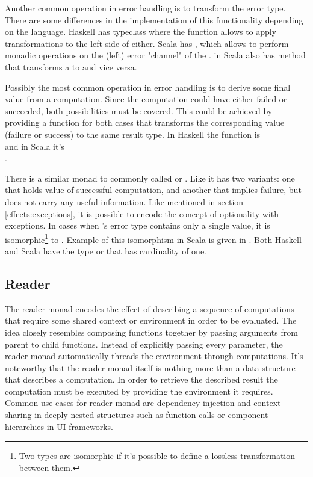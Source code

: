 Another common operation in error handling is to transform the error type. There are some differences in the implementation of this functionality depending on the language. Haskell has  typeclass where the function  allows to apply transformations to the left side of either. Scala has , which allows to perform monadic operations on the (left) error "channel" of the .  in Scala also has  method that transforms a  to  and vice versa.

Possibly the most common operation in error handling is to derive some final value from a computation. Since the computation could have either failed or succeeded, both possibilities must be covered. This could be achieved by providing a function for both cases that transforms the corresponding value (failure or success) to the same result type. In Haskell the function is \\ and in Scala it's \\. 

There is a similar monad to  commonly called  or . Like  it has two variants: one that holds value of successful computation, and another that implies failure, but does not carry any useful information. Like mentioned in section \ref{effects:exceptions}, it is possible to encode the concept of optionality with exceptions. In cases when 's error type contains only a single value, it is isomorphic\footnote{Two types are isomorphic if it's possible to define a lossless transformation between them.} to . Example of this isomorphism in Scala is given in . Both Haskell and Scala have the type  or \inlinecode{()} that has cardinality of one.




\subsection{Reader}
The reader monad encodes the effect of describing a sequence of computations that require some shared context or environment in order to be evaluated. The idea closely resembles composing functions together by passing arguments from parent to child functions. Instead of explicitly passing every parameter, the reader monad automatically threads the environment through computations. It's noteworthy that the reader monad itself is nothing more than a data structure that describes a computation. In order to retrieve the described result the computation must be executed by providing the environment it requires. Common use-cases for reader monad are dependency injection and context sharing in deeply nested structures such as function calls or component hierarchies in UI frameworks.

